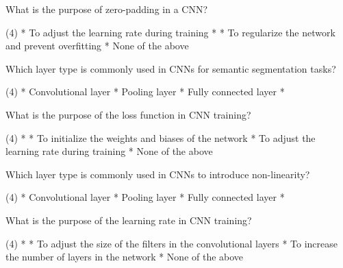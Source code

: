 \documentclass[10pt]{extarticle}
\begin{document}
\begin{exercise}
    What is the purpose of zero-padding in a CNN?
    \begin{choice} (4)
        * To adjust the learning rate during training
        * 
        * To regularize the network and prevent overfitting
        * None of the above
    \end{choice}
\end{exercise}
\begin{solution}
\end{solution}

\begin{exercise}
    Which layer type is commonly used in CNNs for semantic segmentation tasks?
    \begin{choice} (4)
        * Convolutional layer
        * Pooling layer
        * Fully connected layer
        * 
    \end{choice}
\end{exercise}
\begin{solution}
\end{solution}

\begin{exercise}
    What is the purpose of the loss function in CNN training?
    \begin{choice} (4)
        * 
        * To initialize the weights and biases of the network
        * To adjust the learning rate during training
        * None of the above
    \end{choice}
\end{exercise}
\begin{solution}
\end{solution}

\begin{exercise}
    Which layer type is commonly used in CNNs to introduce non-linearity?
    \begin{choice} (4)
        * Convolutional layer
        * Pooling layer
        * Fully connected layer
        * 
    \end{choice}
\end{exercise}
\begin{solution}
\end{solution}

\begin{exercise}
    What is the purpose of the learning rate in CNN training?
    \begin{choice} (4)
        * 
        * To adjust the size of the filters in the convolutional layers
        * To increase the number of layers in the network
        * None of the above
    \end{choice}
\end{exercise}
\begin{solution}
\end{solution}
\end{document}
